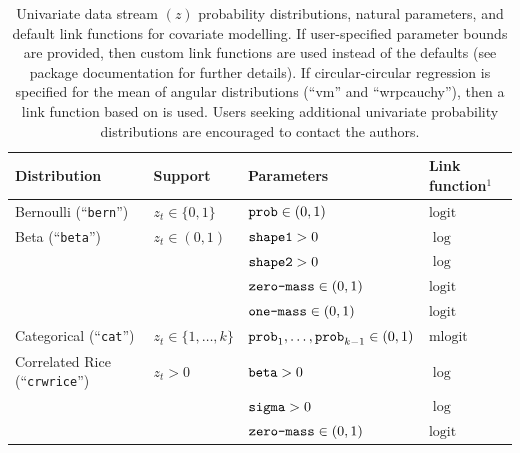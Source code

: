 \documentclass[12pt]{article}\usepackage[]{graphicx}\usepackage[]{xcolor}
\begin{document}
\begin{small}
\begin{table}
  \caption{\label{tab:unipdfs} Univariate data stream $(z)$ probability distributions, natural parameters, and default link functions for covariate modelling. If user-specified parameter bounds are provided, then custom link functions are used instead of the defaults (see package documentation for further details). %
If circular-circular regression is specified for the mean of angular distributions (``vm'' and ``wrpcauchy''), then a link function based on \cite{RivestEtAl2016} is used. Users seeking additional univariate probability distributions are encouraged to contact the authors.}
  \begin{tabular}{llll}
  \toprule
  Distribution                                & Support                       & Parameters                                      & Link function$^1$ \tabularnewline
  \midrule
  \rowcolor{Gray} Bernoulli (``\verb|bern|'') & $z_t\in\{0,1\}$               & $\verb|prob|\in(0,1)$                           &  $\text{logit}$ \tabularnewline  
  Beta (``\verb|beta|'')                      & $z_t\in(0,1)$                 & $\verb|shape1|>0$                               &  $\log$ \tabularnewline  
                                              &                               & $\verb|shape2|>0$                               &  $\log$ \tabularnewline
                                              &                               & $\verb|zero-mass|\in(0,1)$                      &  $\text{logit}$ \tabularnewline 
                                              &                               & $\verb|one-mass|\in(0,1)$                       &  $\text{logit}$ \tabularnewline 
  \rowcolor{Gray} Categorical (``\verb|cat|'')& $z_t\in\{1,\ldots,k\}$        & $\verb|prob|_1,\ldots,\verb|prob|_{k-1}\in(0,1)$&  $\text{mlogit}$ \tabularnewline    
  Correlated Rice (``\verb|crwrice|'')        & $z_t>0$                       & $\verb|beta|>0$                                 &  $\log$ \tabularnewline  
                                              &                               & $\verb|sigma|>0$                                &  $\log$ \tabularnewline  
                                              &                               & $\verb|zero-mass|\in(0,1)$                      &  $\text{logit}$ \tabularnewline 

\end{tabular}
\end{table}
\end{small}
\end{document}
